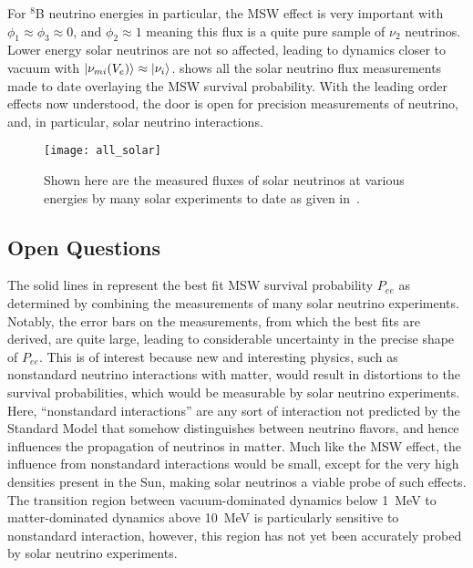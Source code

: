 For $^8$B neutrino energies in particular, the MSW effect is very important with $\phi_1 \approx \phi_3 \approx 0$, and $\phi_2 \approx 1$ meaning this flux is a quite pure sample of $\nu_2$ neutrinos. 
Lower energy solar neutrinos are not so affected, leading to dynamics closer to vacuum with $\ket{\nu_{mi}(V_e)} \approx \ket{\nu_i}$.
 shows all the solar neutrino flux measurements made to date overlaying the MSW survival probability.
With the leading order effects now understood, the door is open for precision measurements of neutrino, and, in particular, solar neutrino interactions.

\begin{figure}
\centering
\texttt{[image: all\_solar]}
\caption{\label{fig:global_solar}Shown here are the measured fluxes of solar neutrinos at various energies by many solar experiments to date as given in~\cite{nonstandard_interactions}.}
\end{figure}

\subsection{Open Questions}
The solid lines in  represent the best fit MSW survival probability $P_{ee}$ as determined by combining the measurements of many solar neutrino experiments.
Notably, the error bars on the measurements, from which the best fits are derived, are quite large, leading to considerable uncertainty in the precise shape of $P_{ee}$.
This is of interest because new and interesting physics, such as nonstandard neutrino interactions with matter, would result in distortions to the survival probabilities, which would be measurable by solar neutrino experiments.
Here, ``nonstandard interactions'' are any sort of interaction not predicted by the Standard Model that somehow distinguishes between neutrino flavors, and hence influences the propagation of neutrinos in matter.
Much like the MSW effect, the influence from nonstandard interactions would be small, except for the very high densities present in the Sun, making solar neutrinos a viable probe of such effects.
The transition region between vacuum-dominated dynamics below 1~MeV to matter-dominated dynamics above 10~MeV is particularly sensitive to nonstandard interaction, however, this region has not yet been accurately probed by solar neutrino experiments.

